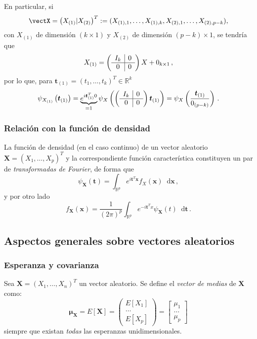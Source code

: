   En particular, si \[ \vectX= \left( X_{(1)} | X_{(2)}\right)^T := (X_{(1),1}, \dots, X_{(1),k}, X_{(2),1}, \dots, X_{(2),p-k}),\] con $X_{(1)}$ de dimensión $(k\times1)$ y $X_{(2)}$ de dimensión $(p-k) \times 1$, se tendría que
  \[
X_{(1)} = \left(\begin{array}{c | c}
    I_k & 0 \\ \hline
    0 & 0
        \end{array}\right)X + 0_{k\times 1}\,,
\]
por lo que, para $\boldsymbol t_{(1)} = (t_1,\dots,t_k)^T \in \mathbb R^k$
\[
\psi_{X_{(1)}}\left(\boldsymbol t_{(1)}\right) = \underbrace{e^{i\boldsymbol t_{(1)}^T 0}}_{=1} \psi_X\left(\left(\begin{array}{c | c}
    I_k & 0 \\ \hline
    0 & 0
        \end{array}\right)\boldsymbol t_{(1)}\right) = \psi_X\left(\frac{\boldsymbol t_{(1)}}{0_{(p-k)}}\right)\,.
\]

\subsubsection{Relación con la función de densidad}

La función de densidad (en el caso continuo) de un vector aleatorio $\boldsymbol X = (X_1,\dots,X_p)^T$ y la correspondiente función característica constituyen un par de \emph{transformadas de Fourier}, de forma que
\[
\psi_{\boldsymbol X}(\boldsymbol t) = \int_{\mathbb R ^p} e^{i \boldsymbol t^T \boldsymbol x} f_X(\boldsymbol x) \mathop{}\!\mathrm{d}\boldsymbol x\,,
\]
y por otro lado
\[
f_{\boldsymbol X}(\boldsymbol x) =  \dfrac{1}{(2\pi)^p} \int_{\mathbb R^p} e^{- i \boldsymbol t^T x} \psi_{\boldsymbol X}(t) \mathop{}\!\mathrm{d}\boldsymbol t\,.
\]


\subsection{Aspectos generales sobre vectores aleatorios}
\subsubsection{Esperanza y covarianza}
\begin{ndef}
  Sea $\boldsymbol X=(X_1,\dots,X_n)^T$ un vector aleatorio. Se define el \emph{vector de medias} de $\boldsymbol X$ como:
  \[
  \boldsymbol \mu_{\boldsymbol X} = E[\boldsymbol X] = \begin{pmatrix}  E[X_1] \\ \dots \\ E[X_p] \end{pmatrix} = \begin{bmatrix} \mu_1 \\ \dots \\ \mu_p \end{bmatrix}
  \]
  siempre que existan \emph{todas} las esperanzas unidimensionales.
  \end{ndef}


